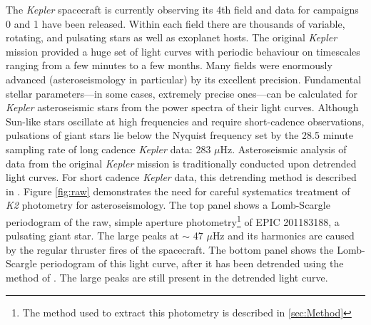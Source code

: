 \documentclass[useAMS, usenatbib]{aastex}
\begin{document}
The {\it Kepler} spacecraft is currently observing its 4th field and data for
campaigns 0 and 1 have been released.
Within each field there are thousands of variable, rotating, and pulsating
stars as well as exoplanet hosts.
The original {\it Kepler} mission provided a huge set of light curves with
periodic behaviour on timescales ranging from a few minutes to a few months.
Many fields were enormously advanced (asteroseismology in particular) by its
excellent precision.
Fundamental stellar parameters---in some cases, extremely precise ones---can
be calculated for {\it Kepler} asteroseismic stars from the power spectra of
their light curves.
Although Sun-like stars oscillate at high frequencies and require
short-cadence observations, pulsations of giant stars lie below the Nyquist
frequency set by the 28.5 minute sampling rate of long cadence {\it Kepler}
data: 283 $\mu$Hz.
Asteroseismic analysis of data from the original {\it Kepler} mission is
traditionally conducted upon detrended light curves.
For short cadence {\it Kepler} data, this detrending method is described in
\citet{Garcia2011}.
Figure \ref{fig:raw} demonstrates the need for careful systematics treatment
of {\it K2} photometry for asteroseismology.
The top panel shows a Lomb-Scargle periodogram of the raw, simple aperture
photometry\footnote{The method used to extract this photometry is described in
\textsection \ref{sec:Method}} of EPIC 201183188, a pulsating giant star.
The large peaks at $\sim$ 47 $\mu$Hz and its harmonics are caused by the
regular thruster fires of the spacecraft.
The bottom panel shows the Lomb-Scargle periodogram of this light curve, after
it has been detrended using the method of \citet{Vanderburg2014}.
The large peaks are still present in the detrended light curve.
\end{document}
